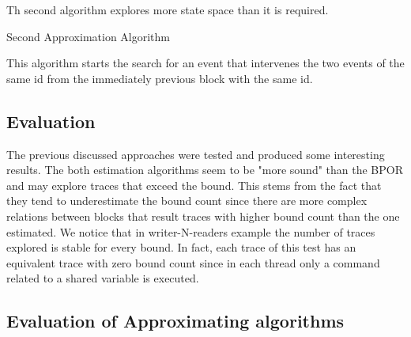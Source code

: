 Th second algorithm explores more state space than it is required.\\

\begin{algorithm}[H]
    \caption{Second Approximation Algorithm}
\end{algorithm}

This algorithm starts the search for an event that intervenes the two events of the same id from the immediately previous block 
with the same id. 

\subsection{Evaluation}
The previous discussed approaches were tested and produced some interesting results. The both estimation algorithms seem to be "more sound" than the BPOR and
may explore traces that exceed the bound. This stems from the fact that they tend to underestimate the bound count since there are more complex relations 
between blocks that result traces with higher bound count than the one estimated. We notice that in writer-N-readers example the number of traces explored
is stable for every bound. In fact, each trace of this test has an equivalent trace with zero bound count since in each thread only a command related to
a shared variable is executed.

\subsection{Evaluation of Approximating algorithms}




